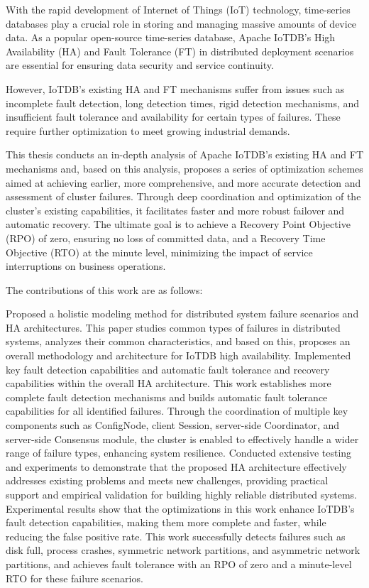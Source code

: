 \begin{abstract*}
  
With the rapid development of Internet of Things (IoT) technology, time-series databases play a crucial role in storing and managing massive amounts of device data. As a popular open-source time-series database, Apache IoTDB's High Availability (HA) and Fault Tolerance (FT) in distributed deployment scenarios are essential for ensuring data security and service continuity.

However, IoTDB's existing HA and FT mechanisms suffer from issues such as incomplete fault detection, long detection times, rigid detection mechanisms, and insufficient fault tolerance and availability for certain types of failures. These require further optimization to meet growing industrial demands.

This thesis conducts an in-depth analysis of Apache IoTDB's existing HA and FT mechanisms and, based on this analysis, proposes a series of optimization schemes aimed at achieving earlier, more comprehensive, and more accurate detection and assessment of cluster failures. Through deep coordination and optimization of the cluster's existing capabilities, it facilitates faster and more robust failover and automatic recovery. The ultimate goal is to achieve a Recovery Point Objective (RPO) of zero, ensuring no loss of committed data, and a Recovery Time Objective (RTO) at the minute level, minimizing the impact of service interruptions on business operations.

The contributions of this work are as follows:

Proposed a holistic modeling method for distributed system failure scenarios and HA architectures. This paper studies common types of failures in distributed systems, analyzes their common characteristics, and based on this, proposes an overall methodology and architecture for IoTDB high availability.
Implemented key fault detection capabilities and automatic fault tolerance and recovery capabilities within the overall HA architecture. This work establishes more complete fault detection mechanisms and builds automatic fault tolerance capabilities for all identified failures. Through the coordination of multiple key components such as ConfigNode, client Session, server-side Coordinator, and server-side Consensus module, the cluster is enabled to effectively handle a wider range of failure types, enhancing system resilience.
Conducted extensive testing and experiments to demonstrate that the proposed HA architecture effectively addresses existing problems and meets new challenges, providing practical support and empirical validation for building highly reliable distributed systems.
Experimental results show that the optimizations in this work enhance IoTDB's fault detection capabilities, making them more complete and faster, while reducing the false positive rate. This work successfully detects failures such as disk full, process crashes, symmetric network partitions, and asymmetric network partitions, and achieves fault tolerance with an RPO of zero and a minute-level RTO for these failure scenarios.



\end{abstract*}
